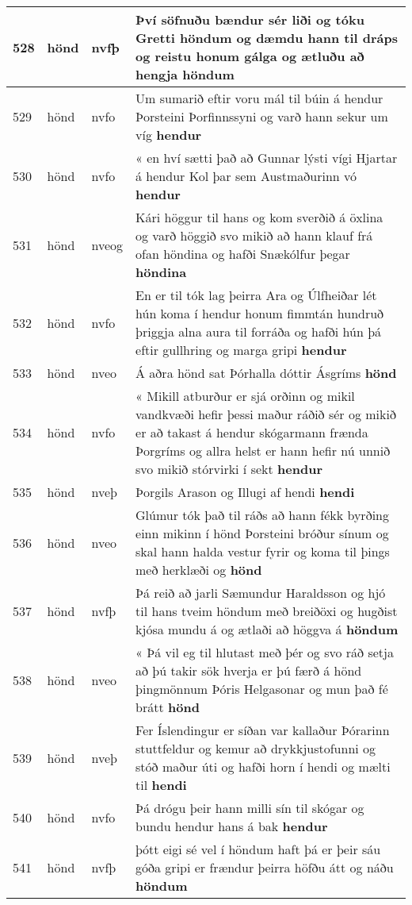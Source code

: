 \documentclass{article}
\begin{document}
\begin{longtable}{p{1cm}|p{1cm}|p{1cm}|p{13cm}}
\hline
528&hönd&nvfþ&Því söfnuðu bændur sér liði og tóku Gretti höndum og dæmdu hann til dráps og reistu honum gálga og ætluðu að hengja \textbf{höndum} \\
\hline
529&hönd&nvfo&Um sumarið eftir voru mál til búin á hendur Þorsteini Þorfinnssyni og varð hann sekur um víg \textbf{hendur} \\
\hline
530&hönd&nvfo&« en hví sætti það að Gunnar lýsti vígi Hjartar á hendur Kol þar sem Austmaðurinn vó \textbf{hendur} \\
\hline
531&hönd&nveog&Kári höggur til hans og kom sverðið á öxlina og varð höggið svo mikið að hann klauf frá ofan höndina og hafði Snækólfur þegar \textbf{höndina} \\
\hline
532&hönd&nvfo&En er til tók lag þeirra Ara og Úlfheiðar lét hún koma í hendur honum fimmtán hundruð þriggja alna aura til forráða og hafði hún þá eftir gullhring og marga gripi \textbf{hendur} \\
\hline
533&hönd&nveo&Á aðra hönd sat Þórhalla dóttir Ásgríms \textbf{hönd} \\
\hline
534&hönd&nvfo&« Mikill atburður er sjá orðinn og mikil vandkvæði hefir þessi maður ráðið sér og mikið er að takast á hendur skógarmann frænda Þorgríms og allra helst er hann hefir nú unnið svo mikið stórvirki í sekt \textbf{hendur} \\
\hline
535&hönd&nveþ&Þorgils Arason og Illugi af hendi \textbf{hendi} \\
\hline
536&hönd&nveo&Glúmur tók það til ráðs að hann fékk byrðing einn mikinn í hönd Þorsteini bróður sínum og skal hann halda vestur fyrir og koma til þings með herklæði og \textbf{hönd} \\
\hline
537&hönd&nvfþ&Þá reið að jarli Sæmundur Haraldsson og hjó til hans tveim höndum með breiðöxi og hugðist kjósa mundu á og ætlaði að höggva á \textbf{höndum} \\
\hline
538&hönd&nveo&« Þá vil eg til hlutast með þér og svo ráð setja að þú takir sök hverja er þú færð á hönd þingmönnum Þóris Helgasonar og mun það fé brátt \textbf{hönd} \\
\hline
539&hönd&nveþ&Fer Íslendingur er síðan var kallaður Þórarinn stuttfeldur og kemur að drykkjustofunni og stóð maður úti og hafði horn í hendi og mælti til \textbf{hendi} \\
\hline
540&hönd&nvfo&Þá drógu þeir hann milli sín til skógar og bundu hendur hans á bak \textbf{hendur} \\
\hline
541&hönd&nvfþ&þótt eigi sé vel í höndum haft þá er þeir sáu góða gripi er frændur þeirra höfðu átt og náðu \textbf{höndum} \\

\end{longtable}
\end{document}

